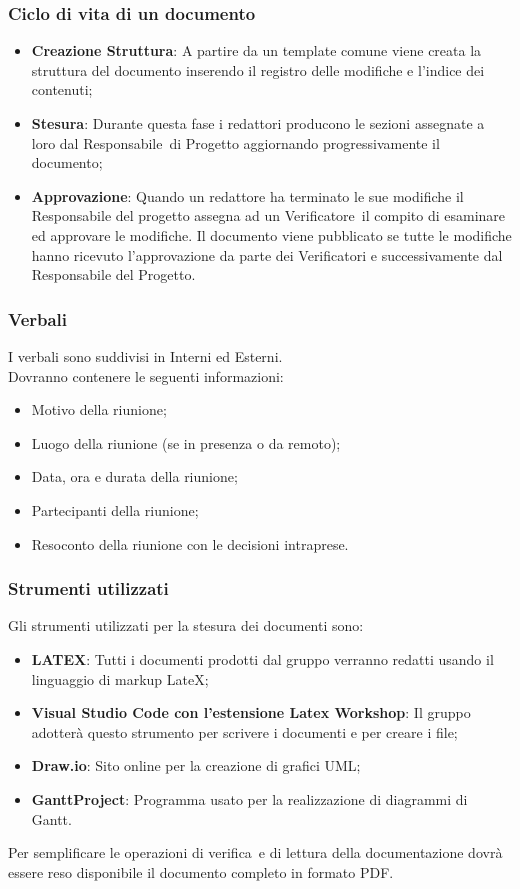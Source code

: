 \subsubsection{Ciclo di vita di un documento}
\begin{itemize}
    \item \textbf{Creazione Struttura}: A partire da un template comune viene creata la struttura del documento inserendo il registro delle modifiche e l’indice dei contenuti;
    \item \textbf{Stesura}: Durante questa fase i redattori producono le sezioni assegnate a loro dal Responsabile\glo\ di Progetto aggiornando progressivamente il documento;
    \item \textbf{Approvazione}: Quando un redattore ha terminato le sue modifiche il Responsabile del progetto assegna ad un Verificatore\glo\ il compito di esaminare ed approvare le modifiche.
Il documento viene pubblicato se tutte le modifiche hanno ricevuto l’approvazione da parte dei Verificatori e successivamente dal Responsabile del Progetto.
\end{itemize}

\subsubsection{Verbali}\label{Verbali}
I verbali sono suddivisi in Interni ed Esterni.\\
Dovranno contenere le seguenti informazioni:
\begin{itemize}
    \item Motivo della riunione;
    \item Luogo della riunione (se in presenza o da remoto);
    \item Data, ora e durata della riunione;
    \item Partecipanti della riunione;
    \item Resoconto della riunione con le decisioni intraprese.
\end{itemize}

\subsubsection{Strumenti utilizzati}
Gli strumenti utilizzati per la stesura dei documenti sono:
\begin{itemize}
    \item \textbf{LATEX}: Tutti i documenti prodotti dal gruppo verranno redatti usando il linguaggio di markup LateX;
    \item \textbf{Visual Studio Code con l’estensione Latex Workshop}: Il gruppo adotterà questo strumento per scrivere i documenti e per creare i file;
    \item \textbf{Draw.io}: Sito online per la creazione di grafici UML;
    \item \textbf{GanttProject}: Programma usato per la realizzazione di diagrammi di Gantt.
\end{itemize}
Per semplificare le operazioni di verifica\glo\ e di lettura della documentazione dovrà essere reso disponibile il documento completo in formato PDF.


